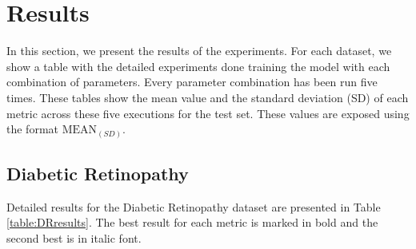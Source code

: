 \documentclass[journal]{IEEEtran}
\begin{document}
	\section{Results}
	\label{sect:results}
	In this section, we present the results of the experiments. For each dataset, we show a table with the detailed experiments done training the model with each combination of parameters. Every parameter combination has been run five times. These tables show the mean value and the standard deviation (SD) of each metric across these five executions for the test set. These values are exposed using the format $\text{MEAN}_{(SD)}$.
	
	\subsection{Diabetic Retinopathy}
	\label{sect:dr}
	Detailed results for the Diabetic Retinopathy dataset are presented in Table \ref{table:DRresults}. The best result for each metric is marked in bold and the second best is in italic font.
	
\end{document}
